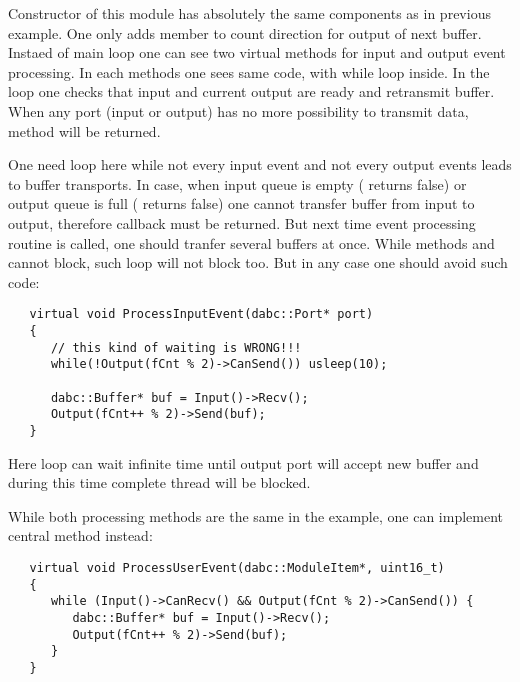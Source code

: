 Constructor of this module has absolutely the same components as in previous example.
One only adds  member to count direction for output of next buffer. 
Instaed of main loop one can see two virtual methods for input and output event
processing. In each methods one sees same code, with while loop inside.
In the loop one checks that input and current output are ready and retransmit buffer.
When any port (input or output) has no more possibility to transmit data, 
method will be returned. 

One need  loop here while not every input event and not every output events
leads to buffer transports. In case, when input queue is empty ( returns false) 
or output queue is full ( returns false) one cannot transfer buffer from input
to output, therefore callback must be returned. But next time event processing routine is
called, one should tranfer several buffers at once. While methods  and   
cannot block, such  loop will not block too. But in any case one should 
avoid such  code:

\begin{small}
\begin{verbatim}
   virtual void ProcessInputEvent(dabc::Port* port) 
   {
      // this kind of waiting is WRONG!!!
      while(!Output(fCnt % 2)->CanSend()) usleep(10);
   
      dabc::Buffer* buf = Input()->Recv();
      Output(fCnt++ % 2)->Send(buf);
   }

\end{verbatim}
\end{small}

Here  loop can wait infinite time until output port will accept new buffer
and during this time complete thread will be blocked. 

While both processing methods are the same in the example,  
one can implement central  method instead:  
 
\begin{small}
\begin{verbatim}
   virtual void ProcessUserEvent(dabc::ModuleItem*, uint16_t)
   {
      while (Input()->CanRecv() && Output(fCnt % 2)->CanSend()) {
         dabc::Buffer* buf = Input()->Recv();
         Output(fCnt++ % 2)->Send(buf);
      }
   }
\end{verbatim}
\end{small}

   

